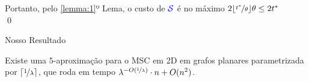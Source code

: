 \begin{frame}{}
    \centering
    Portanto, pelo \ref{lemma:1}º Lema, o custo de ${\color{blue} \mathcal{S}}$ é no máximo $2\lfloor\nicefrac{t^*}{\theta}\rfloor\theta \le 2t^*$ \\\qed
\end{frame}

\begin{frame}{Nosso Resultado}
  \begin{cor}
    Existe uma $5$-aproximação para o MSC em 2D em grafos planares parametrizada por $\lceil \nicefrac{1}{\lambda} \rceil$, que roda em tempo $\lambda^{-O(\nicefrac{1}{\lambda})} \cdot n + O(n^2)$.
  \end{cor}
\end{frame}
